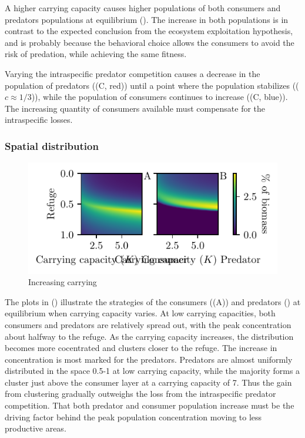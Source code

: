 A higher carrying capacity causes higher populations of both consumers and predators populations at equilibrium (). The increase in both populations is in contrast to the expected conclusion from the ecosystem exploitation hypothesis, and is probably because the behavioral choice allows the consumers to avoid the risk of predation, while achieving the same fitness.

Varying the intraspecific predator competition causes a decrease in the population of predators ((C, red)) until a point where the population stabilizes (($c\approx 1/3$)), while the population of consumers continues to increase ((C, blue)). The increasing quantity of consumers available must compensate for the intraspecific losses.

\subsubsection{Spatial distribution}
\begin{figure}[H]
  \caption{Increasing carrying}
  \label{fig:strat_car}
  \includegraphics{plots/increasing_car_cap_c.pdf}
\end{figure}
The plots in () illustrate the strategies of the consumers ((A)) and predators () at equilibrium when carrying capacity varies. At low carrying capacities, both consumers and predators are relatively spread out, with the peak concentration about halfway to the refuge. As the carrying capacity increases, the distribution becomes more cocentrated and clusters closer to the refuge. The increase in concentration is most marked for the predators. Predators are almost uniformly distributed in the space 0.5-1 at low carrying capacity, while the majority forms a cluster just above the consumer layer at a carrying capacity of 7. Thus the gain from clustering gradually outweighs the loss from the intraspecific predator competition. That both predator and consumer population increase must be the driving factor behind the peak population concentration moving to less productive areas.

